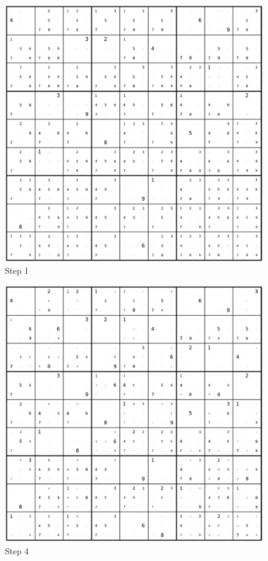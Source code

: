 \begin{figure}
	\caption*{Step 1}
	\centering
	\includegraphics[width=1.0\textwidth]{figures/full/000-01.pdf}
\end{figure}

\begin{figure}
	\caption*{Step 4}
	\centering
	\includegraphics[width=1.0\textwidth]{figures/full/000-04.pdf}
\end{figure}

